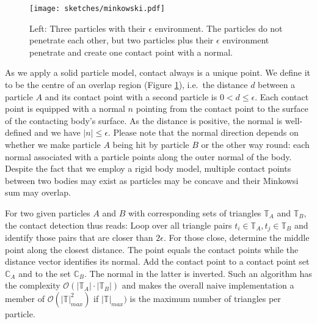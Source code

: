 \begin{figure}[htb]
  \begin{center}
    \texttt{[image: sketches/minkowski.pdf]}
  \end{center}
  \caption{
    Left: Three particles with their $\epsilon $ environment. The particles do
    not penetrate each other, but two particles plus their $\epsilon $
    environment penetrate and create one contact point with a normal. 
  }
  \label{figure:minkowski}
\end{figure}

As we apply a solid particle model, contact always is a unique point. 
We define it to be the centre of an overlap region (Figure \ref{figure:minkowski}), i.e.~the
distance $d$ between a particle $A$ and its contact point with a second particle
is $0 < d \leq \epsilon$.
Each contact point is equipped with a normal $n$ pointing from the contact point
to the surface of the contacting body's surface.
As the distance is positive, the normal is well-defined and we have $|n| \leq
\epsilon $.
Please note that the normal direction depends on whether we make particle $A$
being hit by particle $B$ or the other way round: each normal associated with a
particle points along the outer normal of the body.
Despite the fact that we employ a rigid body model, multiple contact points
between two bodies may exist as particles may be concave and their Minkowsi sum
may overlap.


For two given particles $A$ and $B$ with corresponding sets of triangles
$\mathbb{T}_A$ and $\mathbb{T}_B$, the contact detection thus reads:
Loop over all triangle pairs $t_i \in \mathbb{T}_A, t_j \in \mathbb{T}_B$ and
identify those pairs that are closer than $2\epsilon $.
For those close, determine the middle point along the closest distance. 
The point equals the contact points while the distance vector identifies
its normal.
Add the contact point to a contact point set $\mathbb{C}_A$ and to the set
$\mathbb{C}_B$.
The normal in the latter is inverted.
Such an algorithm has the complexity $\mathcal{O}( | \mathbb{T}_A| \cdot
|\mathbb{T}_B|)$ and makes the overall naive implementation a member of 
$\mathcal{O}( | \mathbb{T} |_{max}^2  )$ if $| \mathbb{T} |_{max} )$
is the maximum number of triangles per particle.



